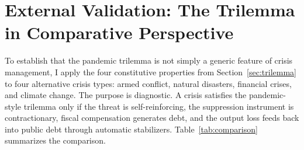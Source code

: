 \documentclass[12pt, a4paper]{article}
\begin{document}
\section{External Validation: The Trilemma in Comparative Perspective}
\label{sec:comparison}

To establish that the pandemic trilemma is not simply a generic feature of crisis management, I apply the four constitutive properties from Section~\ref{sec:trilemma} to four alternative crisis types: armed conflict, natural disasters, financial crises, and climate change. The purpose is diagnostic. A crisis satisfies the pandemic-style trilemma only if the threat is self-reinforcing, the suppression instrument is contractionary, fiscal compensation generates debt, and the output loss feeds back into public debt through automatic stabilizers. Table~\ref{tab:comparison} summarizes the comparison.
\end{document}

